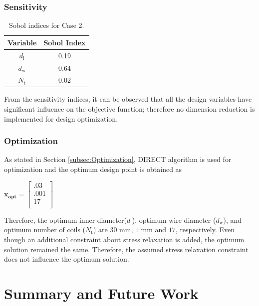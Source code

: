 \documentclass[10pt]{article}
\begin{document}
\subsubsection{Sensitivity}		
\vspace{-.4in}
	\begin{table}[H]
	\caption{Sobol indices for Case 2.}
	\centering
		 \begin{tabular}{ c c}
			 \hline \hline
	 		Variable & Sobol Index\\
			\hline
	 		 $d_{\text{i}}$ & 0.19 \\
			 $d_{\text{w}}$ & 0.64  \\
			 $N_{\text{t}}$ & 0.02 \\ 
			\hline \hline
		 \end{tabular}
	\end{table}


From the sensitivity indices, it can be observed that all the design variables have significant influence on the objective function; therefore no dimension reduction is implemented for design optimization. 

\subsubsection{Optimization}
	
	As stated in Section \ref{subsec:Optimization}, DIRECT algorithm is used for optimization and the optimum design point is obtained as 
	\begin{center}
	$\mathbf{x_{opt}} =
	\left[
	\begin{array}{c}
	 	 .03 \\
	 	 .001 \\
		 17    \\ 
		
	 \end{array}
	 \right]
$	
\end{center}
    Therefore, the optimum inner diameter($d_{\text{i}}$), optimum wire diameter ($d_{\text{w}}$), and optimum number of coils ($N_{\text{t}}$) are $30$ mm, $1 $ mm and $17$, respectively. Even though an additional constraint about stress relaxation is added, the optimum solution remained the same. Therefore, the assumed stress relaxation constraint does not influence the optimum solution.
    
\section{Summary and Future Work}
\label{sec:Summary}
\end{document}
